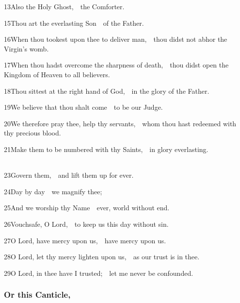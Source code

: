 13\enspace Also the Holy Ghost,\ \star\ the Comforter.



15\enspace Thou art the everlasting Son\ \star\ of the Father.

16\enspace When thou tookest upon thee to deliver man,\ \star\ thou didst not abhor the Virgin’s womb.

17\enspace When thou hadst overcome the sharpness of death,\ \star\ thou didst open the Kingdom of Heaven to all believers.

18\enspace Thou sittest at the right hand of God,\ \star\ in the glory of the Father.

19\enspace We believe that thou shalt come\ \star\ to be our Judge.

20\enspace We therefore pray thee, help thy servants,\ \star\ whom thou hast redeemed with thy precious blood.

21\enspace Make them to be numbered with thy Saints,\ \star\ in glory everlasting.


\\
23\enspace Govern them,\ \star\ and lift them up for ever.

24\enspace Day by day\ \star\ we magnify thee;

25\enspace And we worship thy Name\ \star\ ever, world without end.

26\enspace Vouchsafe, O Lord,\ \star\ to keep us this day without sin.

27\enspace O Lord, have mercy upon us,\ \star\ have mercy upon us.

28\enspace O Lord, let thy mercy lighten upon us,\ \star\ as our trust is in thee.

29\enspace O Lord, in thee have I trusted;\ \star\ let me never be confounded.

\subsubsection{Or this Canticle,}

\subsection{}


